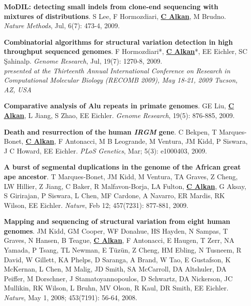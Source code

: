 \vspace{-.2cm}
{\bf MoDIL: detecting small indels from clone-end sequencing with mixtures of distributions}.
S Lee, F Hormozdiari, {\bf {\underline{C Alkan}}}, M Brudno.
{\em Nature Methods},  Jul, 6(7): 473-4, 2009.


\vspace{-.2cm}
{\bf  Combinatorial algorithms for structural variation detection in high throughput sequenced genomes}.
F Hormozdiari*, {\bf {\underline{C Alkan}}}*, EE Eichler, SC \c{S}ahinalp. 
{\em Genome Research}, Jul, 19(7): 1270-8, 2009.\\
\hspace*{1cm} {\footnotesize {\it presented at the
 Thirteenth Annual International Conference on Research in Computational Molecular 
Biology (RECOMB 2009), May 18-21, 2009 Tucson, AZ, USA}}



\vspace{-.2cm}

{\bf Comparative analysis of Alu repeats in primate genomes}.  GE Liu, {\bf {\underline{C Alkan}}}, L Jiang, S Zhao, EE Eichler. 
{\em Genome Research}, 19(5): 876-885, 2009.




\vspace{-.2cm}
{\bf Death and resurrection of the human {\em IRGM} gene}. C Bekpen, T Marques-Bonet,
{\bf {\underline{C Alkan}}}, F Antonacci, M B Leogrande, M Ventura, JM Kidd, P Siswara, J C Howard, EE Eichler. {\em PLoS Genetics}, Mar; 5(3): e1000403, 2009.

\vspace{-.2cm}

{\bf A burst of segmental duplications in the genome of the African great ape ancestor}. T Marques-Bonet, JM Kidd, M Ventura, TA Graves, Z Cheng, LW Hillier, Z Jiang, 
C Baker, R Malfavon-Borja, LA Fulton, {\bf {\underline{C Alkan}}}, G Aksay, S Girirajan,
 P Siswara, L Chen, MF Cardone, A Navarro, ER Mardis,
 RK Wilson, EE Eichler. {\em Nature}, Feb 12; 457(7231): 877-881, 2009.


\vspace{-.2cm}
 {\bf Mapping and sequencing of structural variation from eight human genomes}.
 JM Kidd, GM Cooper, WF Donahue, HS Hayden, 
 N Sampas, T Graves, N Hansen, B Teague, {\bf {\underline{C Alkan}}},  F Antonacci, 
 E Haugen, T Zerr, NA Yamada, P Tsang,  TL Newman, E T\"{u}z\"{u}n, 
 Z Cheng, HM Ebling, N Tusneem, R David, W Gillett, KA Phelps, 
 D Saranga, A Brand, W Tao, E Gustafson, K McKernan, L Chen, 
 M Malig, JD Smith, SA McCarroll, DA Altshuler,  
 DA Peiffer, M Dorschner, J Stamatoyannopoulos, D Schwartz,  
 DA Nickerson, JC Mullikin, RK Wilson, L Bruhn, 
 MV Olson, R Kaul, DR Smith, EE Eichler.
 {\em Nature}, May 1, 2008; 453(7191): 56-64, 2008.


